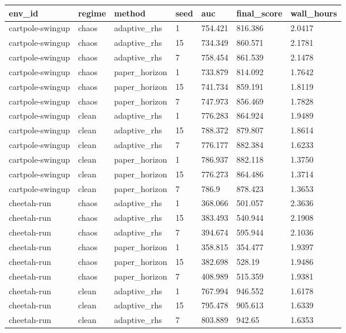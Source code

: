 \begin{tabular}{lllllll}
\toprule
env\_id & regime & method & seed & auc & final\_score & wall\_hours \\
\midrule
cartpole-swingup & chaos & adaptive\_rhs & 1 & 754.421 & 816.386 & 2.0417 \\
cartpole-swingup & chaos & adaptive\_rhs & 15 & 734.349 & 860.571 & 2.1781 \\
cartpole-swingup & chaos & adaptive\_rhs & 7 & 758.454 & 861.539 & 2.1478 \\
cartpole-swingup & chaos & paper\_horizon & 1 & 733.879 & 814.092 & 1.7642 \\
cartpole-swingup & chaos & paper\_horizon & 15 & 741.734 & 859.191 & 1.8119 \\
cartpole-swingup & chaos & paper\_horizon & 7 & 747.973 & 856.469 & 1.7828 \\
cartpole-swingup & clean & adaptive\_rhs & 1 & 776.283 & 864.924 & 1.9489 \\
cartpole-swingup & clean & adaptive\_rhs & 15 & 788.372 & 879.807 & 1.8614 \\
cartpole-swingup & clean & adaptive\_rhs & 7 & 776.177 & 882.384 & 1.6233 \\
cartpole-swingup & clean & paper\_horizon & 1 & 786.937 & 882.118 & 1.3750 \\
cartpole-swingup & clean & paper\_horizon & 15 & 776.273 & 864.486 & 1.3714 \\
cartpole-swingup & clean & paper\_horizon & 7 & 786.9 & 878.423 & 1.3653 \\
cheetah-run & chaos & adaptive\_rhs & 1 & 368.066 & 501.057 & 2.3636 \\
cheetah-run & chaos & adaptive\_rhs & 15 & 383.493 & 540.944 & 2.1908 \\
cheetah-run & chaos & adaptive\_rhs & 7 & 394.674 & 595.944 & 2.1036 \\
cheetah-run & chaos & paper\_horizon & 1 & 358.815 & 354.477 & 1.9397 \\
cheetah-run & chaos & paper\_horizon & 15 & 382.698 & 528.19 & 1.9486 \\
cheetah-run & chaos & paper\_horizon & 7 & 408.989 & 515.359 & 1.9381 \\
cheetah-run & clean & adaptive\_rhs & 1 & 767.994 & 946.552 & 1.6178 \\
cheetah-run & clean & adaptive\_rhs & 15 & 795.478 & 905.613 & 1.6339 \\
cheetah-run & clean & adaptive\_rhs & 7 & 803.889 & 942.65 & 1.6353 \\

\end{tabular}
